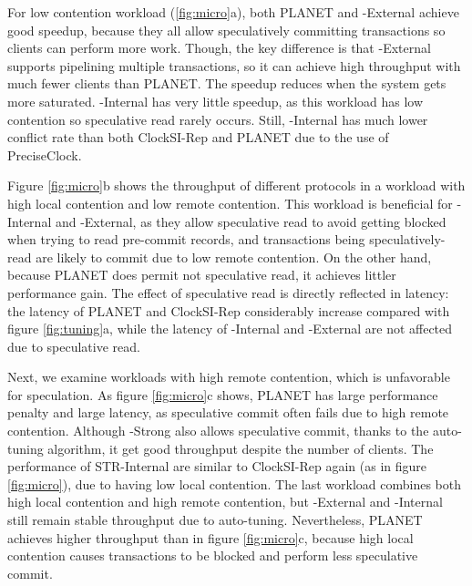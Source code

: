 For low contention workload (\ref{fig:micro}a), both PLANET and {\specula}-External achieve good speedup, because they all allow speculatively committing transactions so clients can perform more work. Though, the key difference is that {\specula}-External supports pipelining multiple transactions, so it can achieve high throughput with much fewer clients than PLANET. The speedup reduces when the system gets more saturated. {\specula}-Internal has very little speedup, as this workload has low contention so speculative read rarely occurs. Still, {\specula}-Internal has much lower conflict rate than both ClockSI-Rep and PLANET due to the use of PreciseClock.

Figure \ref{fig:micro}b shows the throughput of different protocols in a workload with high local contention and low remote contention. This workload is beneficial for {\specula}-Internal and {\specula}-External, as they allow speculative read to avoid getting blocked when trying to read pre-commit records, and transactions being speculatively-read are likely to commit due to low remote contention. On the other hand, because PLANET does permit not speculative read, it achieves littler performance gain. The effect of speculative read is directly reflected in latency: the latency of PLANET and ClockSI-Rep considerably increase compared with figure \ref{fig:tuning}a, while the latency of {\specula}-Internal and {\specula}-External are not affected due to speculative read.

Next, we examine workloads with high remote contention, which is unfavorable for speculation. As figure \ref{fig:micro}c shows, PLANET has large performance penalty and large latency, as speculative commit often fails due to high remote contention. Although {\specula}-Strong also allows speculative commit, thanks to the auto-tuning algorithm, it get good throughput despite the number of clients. The performance of STR-Internal are similar to ClockSI-Rep again (as in figure \ref{fig:micro}), due to having low local contention. The last workload combines both high local contention and high remote contention, but {\specula}-External and {\specula}-Internal still remain stable throughput due to auto-tuning. Nevertheless, PLANET achieves higher throughput than in figure \ref{fig:micro}c, because high local contention causes transactions to be blocked and perform less speculative commit.

